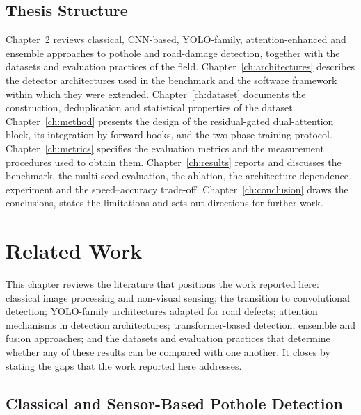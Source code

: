 \documentclass[MScCS]{uccthesis}
\begin{document}
\section{Thesis Structure}
\label{sec:thesis_structure}

Chapter~\ref{ch:related} reviews classical, CNN-based, YOLO-family,
attention-enhanced and ensemble approaches to pothole and road-damage
detection, together with the datasets and evaluation practices of the field.
Chapter~\ref{ch:architectures} describes the detector architectures used in the
benchmark and the software framework within which they were extended.
Chapter~\ref{ch:dataset} documents the construction, deduplication and
statistical properties of the dataset. Chapter~\ref{ch:method} presents the
design of the residual-gated dual-attention block, its integration by forward
hooks, and the two-phase training protocol.
Chapter~\ref{ch:metrics} specifies the evaluation metrics and the measurement
procedures used to obtain them. Chapter~\ref{ch:results} reports and discusses
the benchmark, the multi-seed evaluation, the ablation, the
architecture-dependence experiment and the speed--accuracy trade-off.
Chapter~\ref{ch:conclusion} draws the conclusions, states the
limitations and sets out directions for further work.



\chapter{Related Work}
\label{ch:related}

This chapter reviews the literature that positions the work reported here:
classical image processing and non-visual sensing; the transition to
convolutional detection; YOLO-family architectures adapted for road defects;
attention mechanisms in detection architectures; transformer-based detection;
ensemble and fusion approaches; and the datasets and evaluation practices that
determine whether any of these results can be compared with one another. It
closes by stating the gaps that the work reported here addresses.

\section{Classical and Sensor-Based Pothole Detection}
\label{sec:classical}
\end{document}
